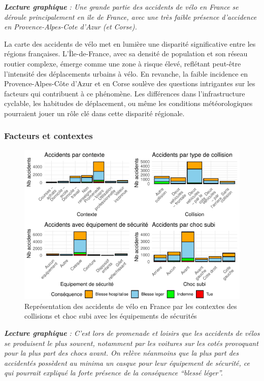 \documentclass[french,]{compterendu}
\theoremstyle{urcastyle}
\theoremstyle{remark}
\begin{document}
\emph{\textbf{Lecture graphique} : Une grande partie des accidents de vélo en France se déroule principalement en île de France, avec une très faible présence d'accidence en Provence-Alpes-Cote d'Azur (et Corse).}

La carte des accidents de vélo met en lumière une disparité significative entre les régions françaises. L'Île-de-France, avec sa densité de population et son réseau routier complexe, émerge comme une zone à risque élevé, reflétant peut-être l'intensité des déplacements urbains à vélo. En revanche, la faible incidence en Provence-Alpes-Côte d'Azur et en Corse soulève des questions intrigantes sur les facteurs qui contribuent à ce phénomène. Les différences dans l'infrastructure cyclable, les habitudes de déplacement, ou même les conditions météorologiques pourraient jouer un rôle clé dans cette disparité régionale.

\hypertarget{facteurs-et-contextes}{%
\subsubsection{Facteurs et contextes}\label{facteurs-et-contextes}}

\begin{figure}[H]

{\centering \includegraphics[width=0.9\linewidth]{Rapport_ADD_LEO-GABET_files/figure-latex/accCONTEXTE-1} 

}

\caption{Représentation des accidents de vélo en France par les contextes des collisions et choc subi avec les équipements de sécurités}\label{fig:accCONTEXTE}
\end{figure}

\emph{\textbf{Lecture graphique} : C'est lors de promenade et loisirs que les accidents de vélos se produisent le plus souvent, notamment par les voitures sur les cotés provoquant pour la plus part des chocs avant. On relève néanmoins que la plus part des accidentés possèdent au minima un casque pour leur équipement de sécurité, ce qui pourrait expliqué la forte présence de la conséquence ``blessé léger''.}
\end{document}
